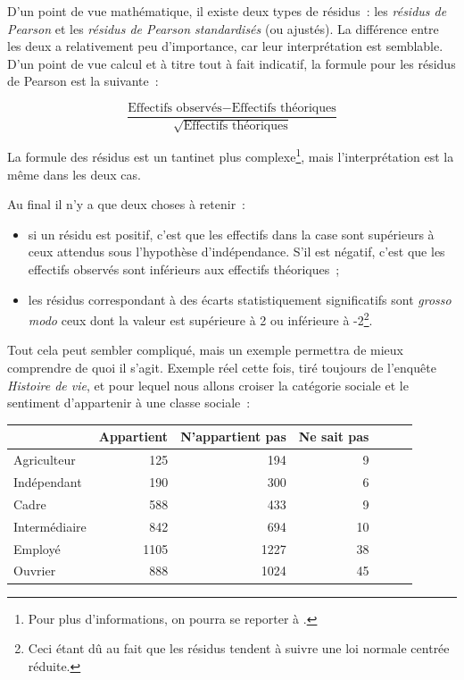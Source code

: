 \documentclass[a4paper,10pt,twoside,francais]{report}
\renewcommand{\cite}{\citep}
\begin{document}
D'un point de vue mathématique, il existe deux types de résidus~: les
\textit{résidus de Pearson} et les \textit{résidus de Pearson
  standardisés} (ou ajustés). La différence entre les deux a
relativement peu d'importance, car leur interprétation est semblable. D'un
point de vue calcul et à titre tout à fait indicatif, la formule pour
les résidus de Pearson est la suivante~:

$$\frac{\text{Effectifs observés} - \text{Effectifs
    théoriques}}{\sqrt{\text{Effectifs théoriques}}}$$

La formule des résidus est un tantinet plus complexe\footnote{Pour
  plus d'informations, on pourra se reporter à
  \cite[p.\,81]{Agresti2002}.}, mais l'interprétation est la même dans
les deux cas.

Au final il n'y a que deux choses à retenir~:

\begin{itemize}
\item si un résidu est positif, c'est que les effectifs dans la case
  sont supérieurs à ceux attendus sous l'hypothèse
  d'indépendance. S'il est négatif, c'est que les effectifs observés
  sont inférieurs aux effectifs théoriques~;
\item les résidus correspondant à des écarts statistiquement
  significatifs sont \textit{grosso modo} ceux dont la valeur est
  supérieure à 2 ou inférieure à -2\footnote{Ceci étant dû au fait que
    les résidus tendent à suivre une loi normale centrée réduite.}.
\end{itemize}

Tout cela peut sembler compliqué, mais un exemple permettra de mieux
comprendre de quoi il s'agit. Exemple réel cette fois, tiré toujours
de l'enquête \textit{Histoire de vie}, et pour lequel nous allons
croiser la catégorie sociale et le sentiment d'appartenir à une
classe sociale~:

\begin{table}[H]
  \begin{center}
    \begin{tabular}[!h]{lrrrrrr}
      \toprule
      & Appartient & N'appartient pas & Ne sait pas \\
      \midrule
      Agriculteur & 125 & 194 & 9 \\
      Indépendant & 190 & 300 & 6 \\
      Cadre & 588 & 433 & 9 \\
      Intermédiaire & 842 & 694 & 10 \\
      Employé & 1105 & 1227 & 38 \\
      Ouvrier & 888 & 1024 & 45 \\
      \bottomrule
    \end{tabular}
  \end{center}
\end{table}
\end{document}
